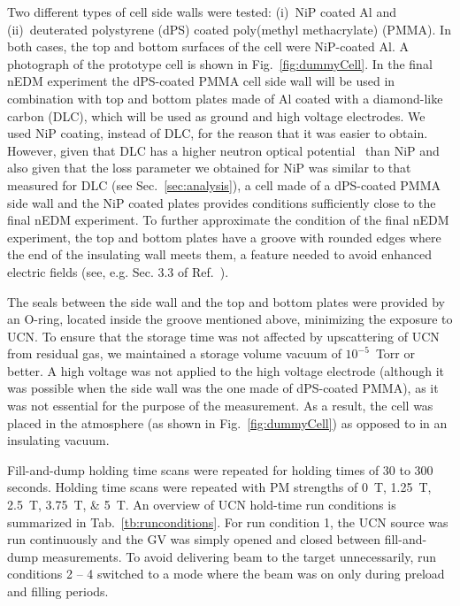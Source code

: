 Two different types of cell side walls were tested: (i)~NiP coated Al and (ii)~deuterated polystyrene (dPS) coated poly(methyl methacrylate) (PMMA). In both cases, the top and bottom surfaces of the cell were NiP-coated Al.  A photograph of the prototype cell is shown in Fig.~\ref{fig:dummyCell}. In the final nEDM experiment the dPS-coated PMMA cell side wall will be used in combination with top and bottom plates made of Al coated with a diamond-like carbon (DLC), which will be used as ground and high voltage electrodes. We used NiP coating, instead of DLC, for the reason that it was easier to obtain. However, given that DLC has a higher neutron optical potential~\cite{Atchison2006} than NiP and also given that the loss parameter we obtained for NiP was similar to that measured for DLC (see Sec.~\ref{sec:analysis}), a cell made of a dPS-coated PMMA side wall and the NiP coated plates provides conditions sufficiently close to the final nEDM experiment. To further approximate the condition of the final nEDM experiment, the top and bottom plates have a groove with rounded edges where the end of the insulating wall meets them, a feature needed to avoid enhanced electric fields (see, e.g. Sec. 3.3 of Ref.~\cite{cp_violation_wo_strangeness}).  

The seals between the side wall and the top and bottom plates were provided by an O-ring, located inside the groove mentioned above, minimizing the exposure to UCN. To ensure that the storage time was not affected by upscattering of UCN from residual gas, we maintained a storage volume vacuum of $10^{-5}$~Torr or better. A high voltage was not applied to the high voltage electrode (although it was possible when the side wall was the one made of dPS-coated PMMA), as it was not essential for the purpose of the measurement. As a result, the cell was placed in the atmosphere (as shown in Fig.~\ref{fig:dummyCell}) as opposed to in an insulating vacuum. 

Fill-and-dump holding time scans were repeated for holding times of 30 to 300 seconds. Holding time scans were repeated with PM strengths of \qtylist{0; 1.25; 2.5; 3.75; 5}{\tesla}. An overview of UCN hold-time run conditions is summarized in Tab.~\ref{tb:runconditions}. For run condition 1, the UCN source was run continuously and the GV was simply opened and closed between fill-and-dump measurements. To avoid delivering beam to the target unnecessarily, run conditions 2 -- 4 switched to a mode where the beam was on only during preload and filling periods.

